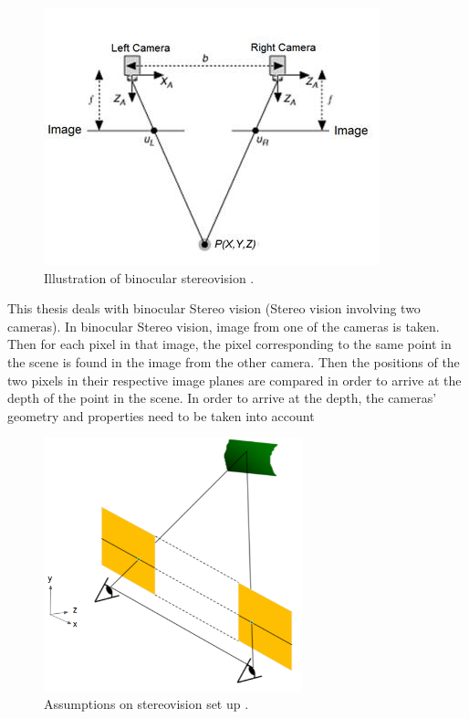 \begin{figure}[!htbp]
    \center
    \includegraphics{figures/StereoVision}
    \caption{Illustration of binocular stereovision \cite{_3d_2013}.}
    \label{fig:bsv}
\end{figure}

This thesis deals with binocular Stereo vision (Stereo vision involving two cameras). In binocular Stereo vision, image from one of the cameras is taken. Then for each pixel in that image, the pixel corresponding to the same point in the scene is found in the image from the other camera. Then the positions of the two pixels in their respective image planes are compared in order to arrive at the depth of the point in the scene. In order to arrive at the depth, the cameras' geometry and properties need to be taken into account\\

\begin{figure}[!htbp]
    \center
    \includegraphics[width=75mm]{figures/Assumptions}
    \caption{Assumptions on stereovision set up \cite{derek_hoiem_epipolar_2011}.}
    \label{fig:assumptionssv}
\end{figure}

